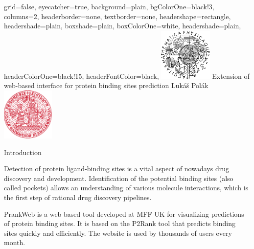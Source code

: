 \documentclass[portrait,a0paper,fontscale=0.25]{baposter}
\begin{document}
\color{black!80} %
\begin{poster}{grid=false,
	eyecatcher=true,
	background=plain,
	bgColorOne=black!3, %
	columns=2,
	headerborder=none,
	textborder=none,
	headershape=rectangle,
	headershade=plain,
	boxshade=plain,
	boxColorOne=white,
	headershade=plain,
	headerColorOne=black!15, %
	headerFontColor=black,
	}%
	{\includegraphics[height=7em]{logos/mff-black.pdf}}
	{Extension of web-based interface for protein binding sites prediction}
	{\vspace{1ex} Lukáš Polák}
	{\includegraphics[height=7em]{logos/uk-red.pdf}}


%
%

\begin{posterbox}[column=0,name=intro]{Introduction}

Detection of protein ligand-binding sites is a vital aspect of nowadays drug discovery and development. Identification of the potential binding sites (also called pockets) allows an understanding of various molecule interactions, which is the first step of rational drug discovery pipelines.

PrankWeb is a web-based tool developed at MFF UK for visualizing predictions of protein binding sites. It is based on the P2Rank tool that predicts binding sites quickly and efficiently. The website is used by thousands of users every month.


\end{posterbox}


\end{poster}
\end{document}
